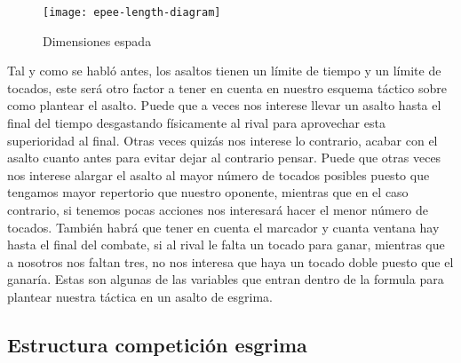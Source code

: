 \begin{figure}[htb]
	\centering
	\texttt{[image: epee-length-diagram]}
	\caption[Dimensiones espada]{Dimensiones espada}
	\label{epee-length-diagram}
\end{figure}

Tal y como se habló antes, los asaltos tienen un límite de tiempo y un límite de tocados,
 este será otro factor a tener en cuenta en nuestro esquema táctico sobre como plantear el asalto.
 Puede que a veces nos interese llevar un asalto hasta el final del tiempo desgastando físicamente al
 rival para aprovechar esta superioridad al final. Otras veces quizás nos interese lo contrario,
 acabar con el asalto cuanto antes para evitar dejar al contrario pensar. Puede que otras veces nos
 interese alargar el asalto al mayor número de tocados posibles puesto que tengamos mayor
 repertorio que nuestro oponente, mientras que en el caso contrario, si tenemos pocas acciones nos interesará
 hacer el menor número de tocados. También habrá que tener en cuenta el marcador y cuanta ventana hay
 hasta el final del combate, si al rival le falta un tocado para ganar, mientras que a nosotros nos faltan
 tres, no nos interesa que haya un tocado doble puesto que el ganaría. Estas son algunas de las variables
 que entran dentro de la formula para plantear nuestra táctica en un asalto de esgrima.

\subsection{Estructura competición esgrima}

